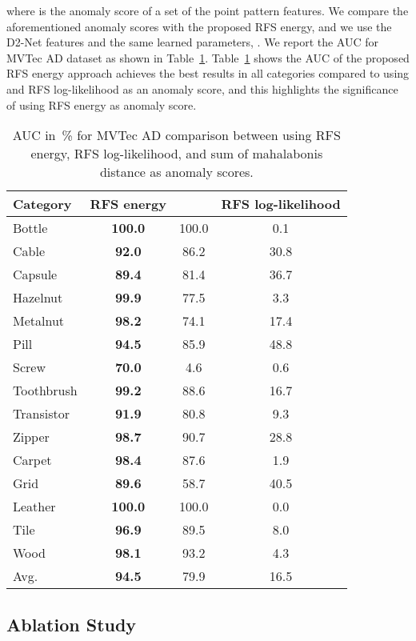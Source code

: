 \documentclass[journal]{IEEEtran}
\let\MYoriglatexcaption\caption
\renewcommand{\caption}[2][\relax]{\MYoriglatexcaption[#2]{#2}}
\begin{document}
where  is the anomaly score of a set of the point pattern features. We compare the aforementioned anomaly scores with the proposed RFS energy, and we use the D2-Net features and the same learned parameters, . We report the AUC for MVTec AD dataset as shown in Table~\ref{Tab:Mal_Vs_rfs}. Table~\ref{Tab:Mal_Vs_rfs} shows the AUC of the proposed RFS energy approach achieves the best results in all categories compared to using  and RFS log-likelihood as an anomaly score, and this highlights the significance of using RFS energy as anomaly score.
\begin{table}[!h]
\centering
\caption{AUC in~\% for MVTec AD comparison between using RFS energy, RFS log-likelihood, and sum of mahalabonis distance  as anomaly scores.}
    \begin{tabular}{lccc}
    \toprule
    \textbf{Category} &RFS energy&&RFS log-likelihood \\
    \hline
    Bottle & \textbf{100.0} & 100.0 & 0.1 \\
    Cable & \textbf{92.0 } & 86.2  & 30.8 \\
    Capsule & \textbf{89.4}  & 81.4  & 36.7 \\
    Hazelnut & \textbf{99.9}  & 77.5  & 3.3 \\
    Metalnut & \textbf{98.2}  & 74.1  & 17.4 \\
    Pill  & \textbf{94.5}  & 85.9  & 48.8 \\
    Screw & \textbf{70.0 } & 4.6   & 0.6 \\
    Toothbrush & \textbf{99.2}  & 88.6  & 16.7 \\
    Transistor & \textbf{91.9}  & 80.8  & 9.3 \\
    Zipper & \textbf{98.7}  & 90.7  & 28.8 \\
     \hline
    Carpet & \textbf{98.4}  & 87.6  & 1.9 \\
    Grid  & \textbf{89.6}  & 58.7  & 40.5 \\
    Leather & \textbf{100.0} & 100.0 & 0.0 \\
    Tile  & \textbf{96.9}  & 89.5  & 8.0 \\
    Wood  & \textbf{98.1}  & 93.2  & 4.3 \\
    \hline
    Avg.  & \textbf{94.5}  & 79.9  & 16.5 \\
        \toprule
    \end{tabular}
    \label{Tab:Mal_Vs_rfs}
\end{table}


\subsection{Ablation Study}
\end{document}
